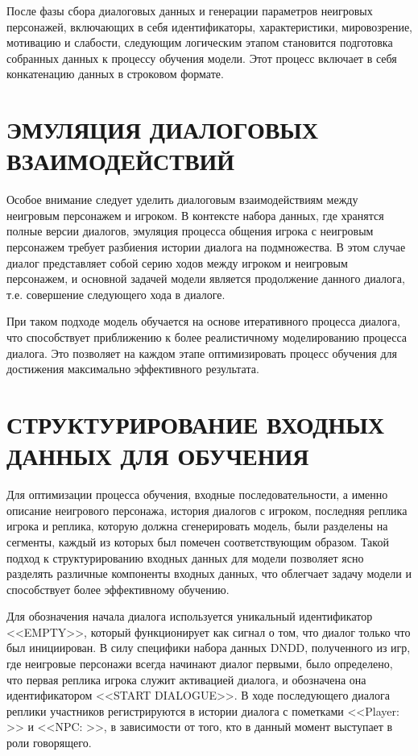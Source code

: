 После фазы сбора диалоговых данных и генерации параметров неигровых персонажей, включающих в себя идентификаторы, характеристики, мировозрение, мотивацию и слабости, следующим логическим этапом становится подготовка собранных данных к процессу обучения модели. Этот процесс включает в себя конкатенацию данных в строковом формате.

\section{ЭМУЛЯЦИЯ ДИАЛОГОВЫХ ВЗАИМОДЕЙСТВИЙ}

Особое внимание следует уделить диалоговым взаимодействиям между неигровым персонажем и игроком. В контексте набора данных, где хранятся полные версии диалогов, эмуляция процесса общения игрока с неигровым персонажем требует разбиения истории диалога на подмножества. В этом случае диалог представляет собой серию ходов между игроком и неигровым персонажем, и основной задачей модели является продолжение данного диалога, т.е. совершение следующего хода в диалоге.

При таком подходе модель обучается на основе итеративного процесса диалога, что способствует приближению к более реалистичному моделированию процесса диалога. Это позволяет на каждом этапе оптимизировать процесс обучения для достижения максимально эффективного результата.

\section{СТРУКТУРИРОВАНИЕ ВХОДНЫХ ДАННЫХ ДЛЯ ОБУЧЕНИЯ}

Для оптимизации процесса обучения, входные последовательности, а именно описание неигрового персонажа, история диалогов с игроком, последняя реплика игрока и реплика, которую должна сгенерировать модель, были разделены на сегменты, каждый из которых был помечен соответствующим образом. Такой подход к структурированию входных данных для модели позволяет ясно разделять различные компоненты входных данных, что облегчает задачу модели и способствует более эффективному обучению.

Для обозначения начала диалога используется уникальный идентификатор <<EMPTY>>, который функционирует как сигнал о том, что диалог только что был инициирован. В силу специфики набора данных DNDD, полученного из игр, где неигровые персонажи всегда начинают диалог первыми, было определено, что первая реплика игрока служит активацией диалога, и обозначена она идентификатором <<START DIALOGUE>>. В ходе последующего диалога реплики участников регистрируются в истории диалога с пометками <<Player: >> и <<NPC: >>, в зависимости от того, кто в данный момент выступает в роли говорящего.

